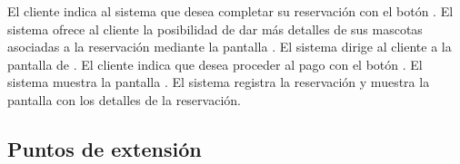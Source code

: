 \begin{UCtrayectoria}
	\UCpaso[] El cliente indica al sistema que desea completar su reservación con el botón .
	\UCpaso[] \label{CU3_Reg_mascota}El sistema ofrece al cliente la posibilidad de dar más detalles de sus mascotas asociadas a la reservación  mediante la pantalla .
	\UCpaso[] El sistema dirige al cliente a la pantalla de .
	\UCpaso[] El cliente indica que desea proceder al pago con el botón .
	\UCpaso[] \label{CU2_Reg_pago}El sistema muestra la pantalla .
	\UCpaso[] El sistema registra la reservación y muestra la pantalla  con los detalles de la reservación.


	
\end{UCtrayectoria}




\subsection{Puntos de extensión}

